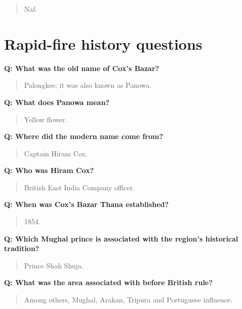 \begin{quote}
Naf.\\
\end{quote}

\medskip

\section{Rapid-fire history questions}

\textbf{Q: What was the old name of Cox's Bazar?}

\begin{quote}
Palongkee; it was also known as Panowa.\\
\end{quote}

\textbf{Q: What does Panowa mean?}

\begin{quote}
Yellow flower.\\
\end{quote}

\textbf{Q: Where did the modern name come from?}

\begin{quote}
Captain Hiram Cox.\\
\end{quote}

\textbf{Q: Who was Hiram Cox?}

\begin{quote}
British East India Company officer.\\
\end{quote}

\textbf{Q: When was Cox's Bazar Thana established?}

\begin{quote}
1854.\\
\end{quote}

\textbf{Q: Which Mughal prince is associated with the region's historical tradition?}

\begin{quote}
Prince Shah Shuja.\\
\end{quote}

\textbf{Q: What was the area associated with before British rule?}

\begin{quote}
Among others, Mughal, Arakan, Tripura and Portuguese influence.\\
\end{quote}

